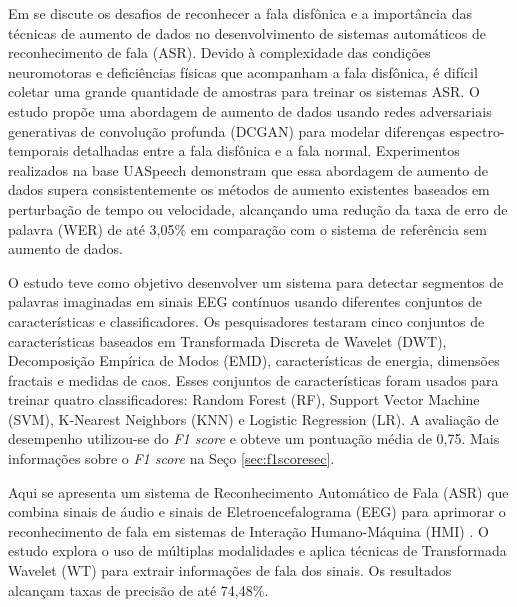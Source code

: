 \documentclass[a4paper,12pt,openright,oneside]{book}
\newenvironment{myenv}[1]
  {\begin{spacing}{#1}}
  {\end{spacing}}
\begin{document}
\begin{myenv}{1.5}
				\par  Em \cite{jin21_interspeech} se discute os desafios de reconhecer a fala disfônica e a importância das técnicas de aumento de dados no desenvolvimento de sistemas automáticos de reconhecimento de fala (ASR). Devido à complexidade das condições neuromotoras e deficiências físicas que acompanham a fala disfônica, é difícil coletar uma grande quantidade de amostras para treinar os sistemas ASR. O estudo propõe uma abordagem de aumento de dados usando redes adversariais generativas de convolução profunda (DCGAN) para modelar diferenças espectro-temporais detalhadas entre a fala disfônica e a fala normal. Experimentos realizados na base UASpeech demonstram que essa abordagem de aumento de dados supera consistentemente os métodos de aumento existentes baseados em perturbação de tempo ou velocidade, alcançando uma redução da taxa de erro de palavra (WER) de até 3,05\% em comparação com o sistema de referência sem aumento de dados.\newline
				
				\par O estudo \cite{WOS:000614122200021} teve como objetivo desenvolver um sistema para detectar segmentos de palavras imaginadas em sinais EEG contínuos usando diferentes conjuntos de características e classificadores. Os pesquisadores testaram cinco conjuntos de características baseados em Transformada Discreta de Wavelet (DWT), Decomposição Empírica de Modos (EMD), características de energia, dimensões fractais e medidas de caos. Esses conjuntos de características foram usados para treinar quatro classificadores: Random Forest (RF), Support Vector Machine (SVM), K-Nearest Neighbors (KNN) e Logistic Regression (LR). A avaliação de desempenho utilizou-se do \textit{F1 score} \cite{tharwat2020classification} e obteve um pontuação média de 0,75. Mais informações sobre o \textit{F1 score} na Seço \ref{sec:f1scoresec}.\newline
				
				\par Aqui se apresenta um sistema de Reconhecimento Automático de Fala (ASR) que combina sinais de áudio e sinais de Eletroencefalograma (EEG) para aprimorar o reconhecimento de fala em sistemas de Interação Humano-Máquina (HMI) \cite{WOS:000591530700001}. O estudo explora o uso de múltiplas modalidades e aplica técnicas de Transformada Wavelet (WT) para extrair informações de fala dos sinais.	Os resultados alcançam taxas de precisão de até 74,48\%.\newline
	

\end{myenv}
\end{document}
